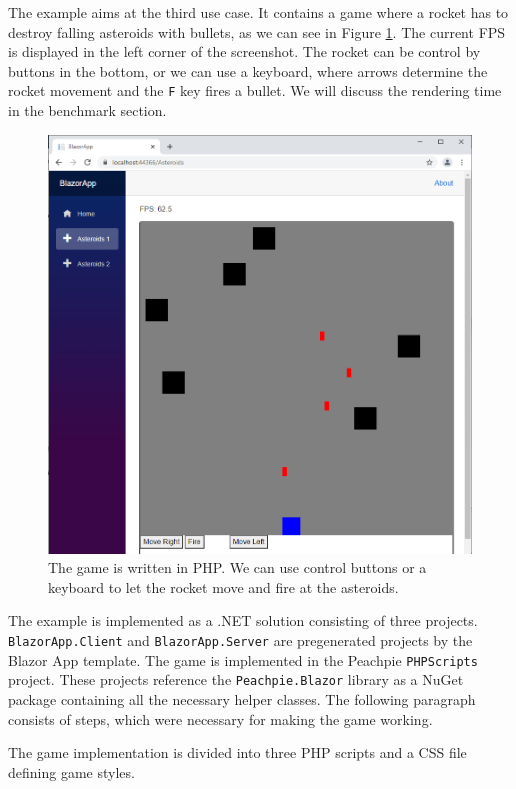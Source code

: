The example aims at the third use case.
It contains a game where a rocket has to destroy falling asteroids with bullets, as we can see in Figure \ref{img28:game}.
The current \ac{FPS} is displayed in the left corner of the screenshot.
The rocket can be control by buttons in the bottom, or we can use a keyboard, where arrows determine the rocket movement and the \texttt{F} key fires a bullet.
We will discuss the rendering time in the benchmark section.
\par
\begin{figure}
\centering
\includegraphics[scale=0.5]{./img/Asteroids}
\caption{The game is written in PHP. We can use control buttons or a keyboard to let the rocket move and fire at the asteroids.}
\label{img28:game}
\end{figure} 
\par
The example is implemented as a .NET solution consisting of three projects. 
\texttt{BlazorApp.Client} and \texttt{BlazorApp.Server} are pregenerated projects by the Blazor App template.
The game is implemented in the Peachpie \texttt{PHPScripts} project.
These projects reference the \texttt{Peachpie.Blazor} library as a NuGet package containing all the necessary helper classes. 
The following paragraph consists of steps, which were necessary for making the game working.
\par
The game implementation is divided into three PHP scripts and a CSS file defining game styles.
